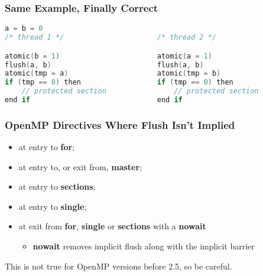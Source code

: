 \begin{frame}[fragile]
  \frametitle{Same Example, Finally Correct}

  \begin{lstlisting}[language=C,morekeywords={foreach,pragma,omp,parallel,single,nowait,task,untied,barrier,taskyield,mergeable,final,taskwait,critical}]
                    a = b = 0
/* thread 1 */                      /* thread 2 */

atomic(b = 1)                       atomic(a = 1)
flush(a, b)                         flush(a, b)
atomic(tmp = a)                     atomic(tmp = b)
if (tmp == 0) then                  if (tmp == 0) then
    // protected section                // protected section
end if                              end if
  \end{lstlisting}
\end{frame}

\begin{frame}
  \frametitle{OpenMP Directives Where Flush Isn't Implied}

  
  \begin{itemize}
    \item at entry to {\bf for};
    \item at entry to, or exit from, {\bf master};
    \item at entry to {\bf sections}; 
    \item at entry to {\bf single};
    \item at exit from {\bf for}, {\bf single} or {\bf sections} with a {\bf nowait}
      \begin{itemize}
        \item {\bf nowait} removes implicit flush along with the implicit barrier
      \end{itemize}
  \end{itemize}

  This is not true for OpenMP versions before 2.5, so be careful.
  
\end{frame}

